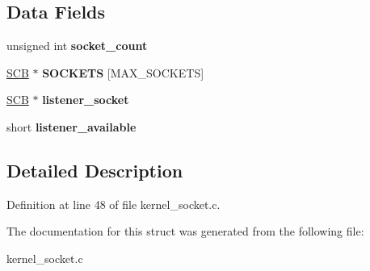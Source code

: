 \subsection*{Data Fields}
\begin{DoxyCompactItemize}
\item 
unsigned int {\bfseries socket\+\_\+count}\hypertarget{structport__control__block_a0360f6071ffc42ff4f050503faaf1bee}{}\label{structport__control__block_a0360f6071ffc42ff4f050503faaf1bee}

\item 
\hyperlink{structsocket__control__block}{S\+CB} $\ast$ {\bfseries S\+O\+C\+K\+E\+TS} \mbox{[}M\+A\+X\+\_\+\+S\+O\+C\+K\+E\+TS\mbox{]}\hypertarget{structport__control__block_a8351d320913a09d106738415102038cf}{}\label{structport__control__block_a8351d320913a09d106738415102038cf}

\item 
\hyperlink{structsocket__control__block}{S\+CB} $\ast$ {\bfseries listener\+\_\+socket}\hypertarget{structport__control__block_a0843e286af579c2a85f6ef59768f2c40}{}\label{structport__control__block_a0843e286af579c2a85f6ef59768f2c40}

\item 
short {\bfseries listener\+\_\+available}\hypertarget{structport__control__block_aabbaa06dd8e23b31baeb8910f78caee3}{}\label{structport__control__block_aabbaa06dd8e23b31baeb8910f78caee3}

\end{DoxyCompactItemize}


\subsection{Detailed Description}


Definition at line 48 of file kernel\+\_\+socket.\+c.



The documentation for this struct was generated from the following file\+:\begin{DoxyCompactItemize}
\item 
kernel\+\_\+socket.\+c\end{DoxyCompactItemize}

